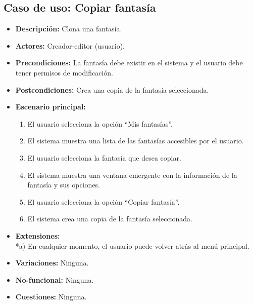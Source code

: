\subsection{Caso de uso: Copiar fantasía}
\begin{itemize}
	\item \textbf{Descripción:} Clona una fantasía.
	\item \textbf{Actores:} Creador-editor (usuario).
	\item \textbf{Precondiciones:} La fantasía debe existir en el sistema y el usuario debe tener permisos de modificación.
	\item \textbf{Postcondiciones:} Crea una copia de la fantasía seleccionada.
	\item \textbf{Escenario principal:}
	\begin{enumerate}
		\item El usuario selecciona la opción ``Mis fantasías''.
		\item El sistema muestra una lista de las fantasías accesibles por el usuario.
		\item El usuario selecciona la fantasía que desea copiar.
		\item El sistema muestra una ventana emergente con la información de la fantasía y sus opciones.
		\item El usuario selecciona la opción ``Copiar fantasía''.
		\item El sistema crea una copia de la fantasía seleccionada.
	\end{enumerate}
	\item \textbf{Extensiones:} \\ *a) En cualquier momento, el usuario puede volver atrás al menú principal.
	\item \textbf{Variaciones:} Ninguna.
	\item \textbf{No-funcional:} Ninguna.
	\item \textbf{Cuestiones:} Ninguna.
\end{itemize}

